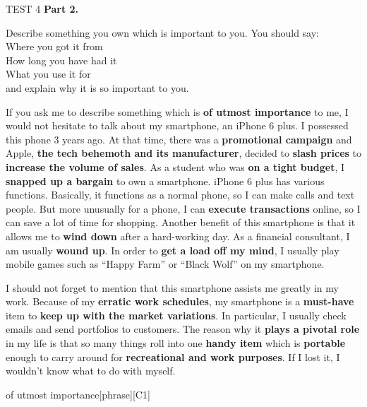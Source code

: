 \begin{glossarymc}[Cambridge 3]
\begin{test}{TEST 4}
\noindent
\textbf{Part 2.}

\begin{qa}{Describe something you own which is important to you. You should say:
\\ Where you got it from
\\ How long you have had it
\\ What you use it for
\\ and explain why it is so important to you.}

If you ask me to describe something which is \textbf{of utmost importance} to me, I would not hesitate to talk about my smartphone, an iPhone 6 plus. I possessed this phone 3 years ago. At that time, there was a \textbf{promotional campaign} and Apple, \textbf{the tech behemoth and its manufacturer}, decided to \textbf{slash prices} to \textbf{increase the volume of sales}. As a student who was \textbf{on a tight budget}, I \textbf{snapped up a bargain} to own a smartphone. iPhone 6 plus has various functions. Basically, it functions as a normal phone, so I can make calls and text people. But more unusually for a phone, I can \textbf{execute transactions} online, so I can save a lot of time for shopping. Another benefit of this smartphone is that it allows me to \textbf{wind down} after a hard-working day. As a financial consultant, I am usually \textbf{wound up}. In order to \textbf{get a load off my mind}, I usually play mobile games such as ``Happy Farm'' or ``Black Wolf'' on my smartphone.

I should not forget to mention that this smartphone assists me greatly in my work. Because of my \textbf{erratic work schedules}, my smartphone is a \textbf{must-have} item to \textbf{keep up with the market variations}. In particular, I usually check emails and send portfolios to customers. The reason why it \textbf{plays a pivotal role} in my life is that so many things roll into one \textbf{handy item} which is \textbf{portable} enough to carry around for \textbf{recreational and work purposes}. If I lost it, I wouldn't know what to do with myself.
\end{qa}


\begin{VocabExplain}[Part 2]
    \begin{ExplainCard}{of utmost importance}[phrase][C1]
\end{ExplainCard}


\end{VocabExplain}
\end{test}
\end{glossarymc}
